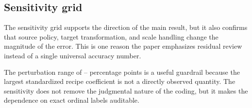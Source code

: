\documentclass[11pt]{article}
\begin{document}
\subsection{Sensitivity grid}
\begin{table}[H]
\centering\scriptsize
\caption{Best full-model sensitivity settings among the grid runs.}
\resizebox{\textwidth}{!}{\SensitivityTable}
\label{tab:sensitivity}
\end{table}

The sensitivity grid supports the direction of the main result, but it also confirms that source policy, target transformation, and scale handling change the magnitude of the error. This is one reason the paper emphasizes residual review instead of a single universal accuracy number.

\begin{table}[H]
\centering\small
\caption{Sensitivity to one-step perturbations of the hand-coded ordinal recipe variables. Each iteration perturbs model-level math-intensity, code-pretraining, and synthetic-quality codes by -1, 0, or +1, clipped to the 0--2 coding range.}
\RecipeSensitivityTable
\label{tab:recipe_sensitivity}
\end{table}

The perturbation range of \RecipeSensitivityLow{}--\RecipeSensitivityHigh{} percentage points is a useful guardrail because the largest standardized recipe coefficient is not a directly observed quantity. The sensitivity does not remove the judgmental nature of the coding, but it makes the dependence on exact ordinal labels auditable.
\end{document}
